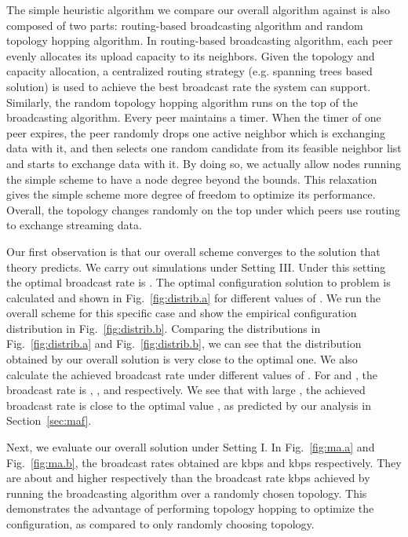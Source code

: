 \documentclass[10pt,conference]{IEEEtran}
\begin{document}
The simple heuristic algorithm we compare our overall algorithm against is also composed of two parts: routing-based broadcasting algorithm and random topology hopping algorithm. In routing-based broadcasting algorithm, each peer evenly allocates its upload capacity to its neighbors. Given the topology and capacity allocation, a centralized routing strategy (e.g. spanning trees based solution) is used to achieve the best broadcast rate the system can support. Similarly, the random topology hopping algorithm runs on the top of the broadcasting algorithm. Every peer maintains a timer. When the timer of one peer expires, the peer randomly drops one active neighbor which is exchanging data with it, and then selects one random candidate from its feasible neighbor list and starts to exchange data with it. By doing so, we actually allow nodes running the simple scheme to have a node degree beyond the bounds. This relaxation gives the simple scheme more degree of freedom to optimize its performance. Overall, the topology changes randomly on the top under which peers use routing to exchange streaming data.

Our first observation is that our overall scheme converges to the solution that theory predicts. We carry out simulations under Setting III.  Under this setting the optimal broadcast rate is . The optimal configuration solution to problem  is calculated and shown in Fig.~\ref{fig:distrib.a} for different values of . We run the overall scheme for this specific case and show the empirical configuration distribution in Fig.~\ref{fig:distrib.b}. Comparing the distributions in Fig.~\ref{fig:distrib.a} and Fig.~\ref{fig:distrib.b}, we can see that the distribution obtained by our overall solution is very close to the optimal one. We also calculate the achieved broadcast rate under different values of . For  and , the broadcast rate is , , and  respectively. We see that with large , the achieved broadcast rate is close to the optimal value , as predicted by our analysis in Section~\ref{sec:maf}.

Next, we evaluate our overall solution under Setting I. In Fig.~\ref{fig:ma.a} and Fig.~\ref{fig:ma.b}, the broadcast rates obtained are  kbps and  kbps respectively. They are about  and  higher respectively than the broadcast rate  kbps achieved by running the broadcasting algorithm over a randomly chosen topology. This demonstrates the advantage of performing topology hopping to optimize the configuration, as compared to only randomly choosing topology.
\end{document}
